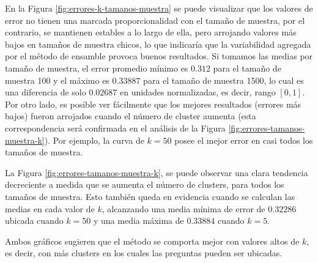 \bigskip En la Figura \ref{fig:errores-k-tamanos-muestra} se puede visualizar que los valores de error no tienen una marcada proporcionalidad con el tamaño de muestra, por el contrario, se mantienen estables a lo largo de ella, pero arrojando valores más bajos en tamaños de muestra chicos, lo que indicaría que la variabilidad agregada por el método de ensamble provoca buenos resultados. Si tomamos las medias por tamaño de muestra, el error promedio mínimo es \(0.312\) para el tamaño de muestra 100 y el máximo es \(0.33887\) para el tamaño de muestra 1500, lo cual es una diferencia de solo \(0.02687\) en unidades normalizadas, es decir, rango \([0, 1]\). Por otro lado, es posible ver fácilmente que los mejores resultados (errores más bajos) fueron arrojados cuando el número de cluster aumenta (esta correspondencia será confirmada en el análisis de la Figura \ref{fig:errores-tamanos-muestra-k}). Por ejemplo, la curva de \(k = 50\) posee el mejor error en casi todos los tamaños de muestra.

\bigskip La Figura \ref{fig:errores-tamanos-muestra-k}, se puede observar una clara tendencia decreciente a medida que se aumenta el número de clusters, para todos los tamaños de muestra. Esto también queda en evidencia cuando se calculan las medias en cada valor de \(k\), alcanzando una media mínima de error de \(0.32286\) ubicada cuando \(k = 50\) y una media máxima de \(0.33884\) cuando \(k = 5\).

\bigskip Ambos gráficos sugieren que el método se comporta mejor con valores altos de \(k\), es decir, con más clusters en los cuales las preguntas pueden ser ubicadas.